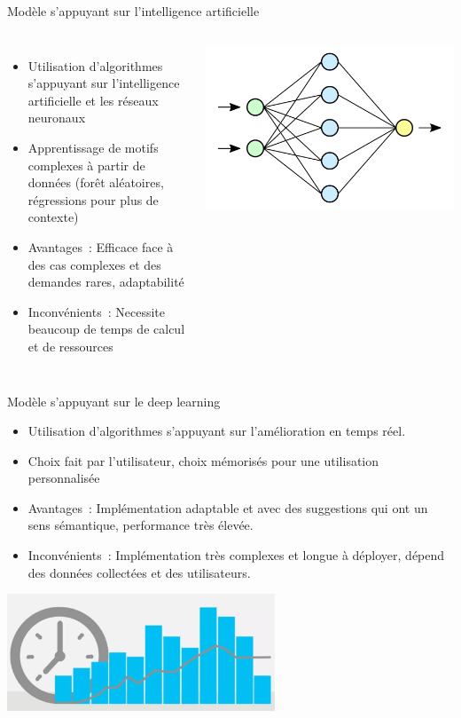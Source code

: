 \begin{frame}{Modèle s'appuyant sur l'intelligence artificielle}
    \begin{columns}
     \begin{itemize}
		\item Utilisation d'algorithmes s'appuyant sur l'intelligence artificielle et les réseaux neuronaux
            \item Apprentissage de motifs complexes à partir de données (forêt aléatoires, régressions pour plus de contexte)
		\item Avantages~: Efficace face à des cas complexes et des demandes rares, adaptabilité
		\item Inconvénients~: Necessite beaucoup de temps de calcul et de ressources
    \end{itemize}
        \includegraphics[width=\textwidth]{images/intelligence.png}
    \end{columns}
\end{frame}


\begin{frame}{Modèle s'appuyant sur le deep learning}
	\begin{itemize}
		\item Utilisation d'algorithmes s'appuyant sur l'amélioration en temps réel.
            \item Choix fait par l'utilisateur, choix mémorisés pour une utilisation personnalisée
		\item Avantages~: Implémentation adaptable et avec des suggestions qui ont un sens sémantique, performance très élevée.
		\item Inconvénients~: Implémentation très complexes et longue à déployer, dépend des données collectées et des utilisateurs.
	\end{itemize}
        \begin{center}
			\includegraphics[width=0.6\textwidth]{images/learning.png}
	\end{center}
\end{frame}

